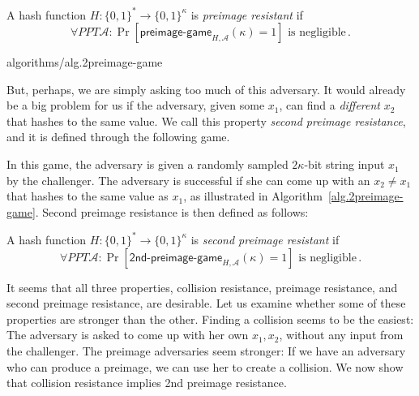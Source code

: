 \begin{definition}
  A hash function $H: \{0, 1\}^* \longrightarrow \{0, 1\}^\kappa$ is \emph{preimage resistant}
  if
  \[
    \forall PPT \mathcal{A}:
    \Pr[\textsf{preimage-game}_{H,\mathcal{A}}(\kappa) = 1] \text{ is negligible}\,.
  \]
\end{definition}

{algorithms/alg.2preimage-game}

But, perhaps, we are simply asking too much of this adversary. It would already be a big problem
for us if the adversary, given some $x_1$, can find a \emph{different} $x_2$ that hashes to the same
value. We call this property \emph{second preimage resistance}, and it is defined through the following
game.

In this game, the adversary is given a randomly sampled $2\kappa$-bit string input $x_1$ by the challenger.
The adversary is successful if she can come up with an $x_2 \neq x_1$ that hashes to the same value as $x_1$,
as illustrated in Algorithm~\ref{alg.2preimage-game}.
Second preimage resistance is then defined as follows:

\begin{definition}
  A hash function $H: \{0, 1\}^* \longrightarrow \{0, 1\}^\kappa$ is \emph{second preimage resistant}
  if
  \[
    \forall PPT \mathcal{A}:
    \Pr[\textsf{2nd-preimage-game}_{H,\mathcal{A}}(\kappa) = 1] \text{ is negligible}\,.
  \]
\end{definition}

It seems that all three properties, collision resistance, preimage resistance, and second preimage
resistance, are desirable. Let us examine whether some of these properties are stronger than the other.
Finding a collision seems to be the easiest: The adversary is asked to come up with her own $x_1, x_2$,
without any input from the challenger. The preimage adversaries seem stronger: If we have
an adversary who can produce a preimage, we can use her to create a collision.
We now show that collision resistance implies 2nd preimage resistance.

